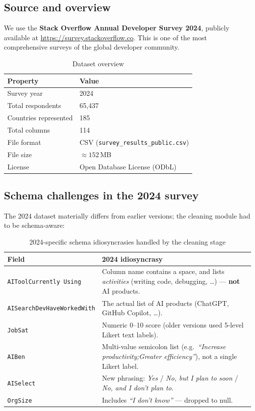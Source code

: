 \documentclass[11pt,a4paper]{article}
\begin{document}
\subsection{Source and overview}

We use the \textbf{Stack Overflow Annual Developer Survey 2024}, publicly
available at \url{https://survey.stackoverflow.co}. This is one of the most
comprehensive surveys of the global developer community.

\begin{table}[H]
\centering
\caption{Dataset overview}
\begin{tabular}{ll}
\toprule
\textbf{Property}       & \textbf{Value} \\
\midrule
Survey year             & 2024 \\
Total respondents       & 65{,}437 \\
Countries represented   & 185 \\
Total columns           & 114 \\
File format             & CSV (\texttt{survey\_results\_public.csv}) \\
File size               & $\approx 152$\,MB \\
License                 & Open Database License (ODbL) \\
\bottomrule
\end{tabular}
\end{table}

\subsection{Schema challenges in the 2024 survey}

The 2024 dataset materially differs from earlier versions; the cleaning
module had to be schema-aware:

\begin{table}[H]
\centering
\caption{2024-specific schema idiosyncrasies handled by the cleaning stage}
\begin{tabular}{p{4.6cm}p{8cm}}
\toprule
\textbf{Field} & \textbf{2024 idiosyncrasy} \\
\midrule
\texttt{AIToolCurrently Using} & Column name contains a space, and lists
\textit{activities} (writing code, debugging, \ldots) --- \textbf{not} AI
products. \\
\texttt{AISearchDevHaveWorkedWith} & The actual list of AI products
(ChatGPT, GitHub Copilot, \ldots). \\
\texttt{JobSat} & Numeric 0--10 score (older versions used 5-level Likert
text labels). \\
\texttt{AIBen} & Multi-value semicolon list (e.g.~\textit{``Increase
productivity;Greater efficiency''}), not a single Likert label. \\
\texttt{AISelect} & New phrasing: \textit{Yes} / \textit{No, but I plan to
soon} / \textit{No, and I don't plan to}. \\
\texttt{OrgSize} & Includes \textit{``I don't know''} --- dropped to null. \\
\bottomrule
\end{tabular}
\end{table}
\end{document}
